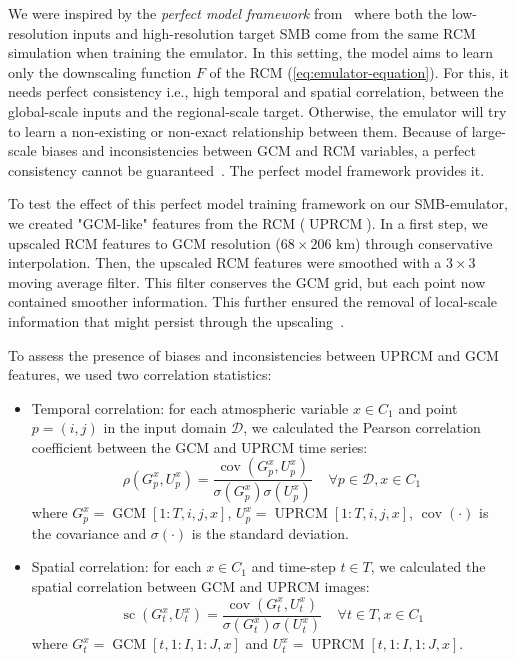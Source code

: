 \documentclass[a4paper,11pt,oneside]{report}
\begin{document}
We were inspired by the \textit{perfect model framework} from~\cite{Doury} where both the low-resolution inputs and high-resolution target SMB come from the same RCM simulation when training the emulator. In this setting, the model aims to learn only the downscaling function $F$ of the RCM (\autoref{eq:emulator-equation}). For this, it needs perfect consistency i.e., high temporal and spatial correlation, between the global-scale inputs and the regional-scale target. Otherwise, the emulator will try to learn a non-existing or non-exact relationship between them. Because of large-scale biases and inconsistencies between GCM and RCM variables, a perfect consistency cannot be guaranteed~\cite{Doury, Sanchez2009, Sanchez2018}. The perfect model framework provides it.

To test the effect of this perfect model training framework on our SMB-emulator, we created "GCM-like" features from the RCM ($\operatorname{UPRCM}$). In a first step, we upscaled RCM features to GCM resolution ($68\times206$ km) through conservative interpolation. Then, the upscaled RCM features were smoothed with a $3\times3$ moving average filter. This filter conserves the GCM grid, but each point now contained smoother information. This further ensured the removal of local-scale information that might persist through the upscaling~\cite{Doury, Klaver2020}.


To assess the presence of biases and inconsistencies between UPRCM and GCM features, we used two correlation statistics:  
\begin{itemize}
        \item Temporal correlation: for each atmospheric variable $x\in C_1$ and point $p = (i,j)$ in the input domain $\mathcal{D}$, we calculated the Pearson correlation coefficient between the GCM and UPRCM time series:
        \begin{equation}\label{eq:temporal-corr}
            \rho\left(G_{p}^x,U_{p}^x\right) = \frac{\operatorname{cov}(G_{p}^x,U_{p}^x)}{\sigma(G_{p}^x)\sigma(U_{p}^x)} \;\;\;\; \forall p \in \mathcal{D}, x\in C_1 
        \end{equation}
        where $G_{p}^x = \operatorname{GCM}[1:T, i, j, x]$, $U_{p}^x = \operatorname{UPRCM}[1:T, i, j, x]$, $\operatorname {cov}(\cdot)$  is the covariance and  $\sigma(\cdot)$ is the standard deviation.  
        \item Spatial correlation: for each $x\in C_1$ and time-step $t \in T$, we calculated the spatial correlation between GCM and UPRCM images: 
        \begin{equation}\label{eq:spatial-corr}
            \operatorname{sc}\left(G_{t}^x,U_{t}^x\right) = \frac{\operatorname{cov}(G_{t}^x,U_{t}^x)}{\sigma(G_{t}^x)\sigma(U_{t}^x)} \;\;\;\; \forall t \in T, x\in C_1 
        \end{equation}
        where $G_{t}^x = \operatorname{GCM}[t,1:I,1:J,x]$ and $U_{t}^x =\operatorname{UPRCM}[t,1:I,1:J,x]$. 
    \end{itemize}
\end{document}
